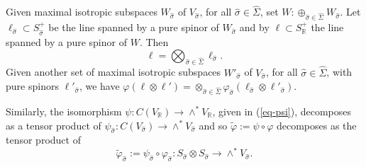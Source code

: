 \documentclass[12pt]{amsart}
\newcommand{\hide}[1]{}
\numberwithin{equation}{subsection}
\theoremstyle{plain}
\theoremstyle{definition}
\newcommand{\RR}{{\mathbb R}}
\begin{document}
{Given maximal isotropic subspaces $W_{\hat{\sigma}}$ of $V_{\hat{\sigma}}$, for all $\hat{\sigma}\in \hat{\Sigma}$, set $W:\oplus_{\hat{\sigma}\in \hat{\Sigma}}W_{\hat{\sigma}}$. Let $\ell_{\hat{\sigma}}\subset S^+_{\hat{\sigma}}$ be the line spanned by a pure spinor of $W_{\hat{\sigma}}$ and by $\ell\subset S^+_\RR$ 
the line spanned by a pure spinor of $W$. Then 
\begin{equation}
\label{eq-tensor-product-decomposition-of-pure-spinor}
\ell=\bigotimes_{\hat{\sigma}\in \hat{\Sigma}}\ell_{\hat{\sigma}}.
\end{equation}
Given another set of maximal isotropic subspaces $W'_{\hat{\sigma}}$ of $V_{\hat{\sigma}}$, for all $\hat{\sigma}\in \hat{\Sigma}$, with pure spinors $\ell'_{\hat{\sigma}}$, we have
$\varphi(\ell\otimes\ell')=\otimes_{\hat{\sigma}\in \hat{\Sigma}}\varphi_{\hat{\sigma}}(\ell_{\hat{\sigma}}\otimes\ell'_{\hat{\sigma}}).$

Similarly, the isomorphism $\psi:C(V_\RR)\rightarrow \wedge^*V_\RR$, given in (\ref{eq-psi}), decomposes as a tensor product of
$\psi_{\hat{\sigma}}:C(V_{\hat{\sigma}})\rightarrow \wedge^*V_{\hat{\sigma}}$ and so $\tilde{\varphi}:=\psi\circ\varphi$ decomposes as the tensor product of 
\begin{equation}
\label{eq-tilde-varphi-hat-sigma}
\tilde{\varphi}_{\hat{\sigma}}:=\psi_{\hat{\sigma}}\circ \varphi_{\hat{\sigma}}:S_{\hat{\sigma}}\otimes S_{\hat{\sigma}}\rightarrow \wedge^*V_{\hat{\sigma}}.
\end{equation}

\hide{
maps $S_{\hat{\sigma}_0}\otimes S_{\hat{\sigma}_0}$ to 
$C(V_{\hat{\sigma}_0})\otimes \otimes_{\{\hat{\sigma} \ : \ \hat{\sigma}\neq\hat{\sigma}_0\}}\wedge^{top}H^1_{\hat{\sigma}}(\hat{X})$,
where we regard $\wedge^{top}H^1_{\hat{\sigma}}(\hat{X})$ as a line in $C(V_{\hat{\sigma}})$.
Given a pure spinor $\ell$ in $S^+_{\hat{\sigma}_0}$ of a maximal isotropic subspace $W$ in $V_{\hat{\sigma}_0}$, the isomorphism $\varphi$ maps 
$\ell\otimes\ell$ to 
the tensor product of $\wedge^{top}W$ (??? $\varphi_{\hat{\sigma}_0}(\ell\otimes\ell)$ ???) with $\otimes_{\{\hat{\sigma} \ : \ \hat{\sigma}\neq\hat{\sigma}_0\}}\wedge^{top}H^1_{\hat{\sigma}}(\hat{X})$, which projects, in the appropriate graded summand, onto
the top wedge product of the maximal isotropic subspace $W\oplus \oplus_{\{\hat{\sigma} \ : \ \hat{\sigma}\neq\hat{\sigma}_0\}} H^1_{\hat{\sigma}}(\hat{X})$.
The pure spinor $\ell$, as a line on the left hand side, is mapped to its tensor product with the pure spinors $1_{\hat{\sigma}}$, $\hat{\sigma}\neq\hat{\sigma}_0$, on the right hand side.
}

}
\end{document}
